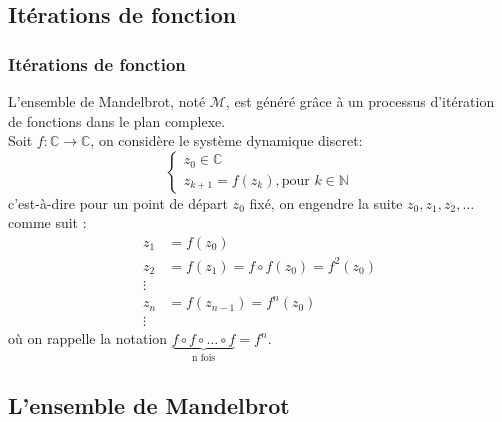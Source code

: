 \documentclass[aspectratio=1610]{beamer}
\begin{document}
\subsection{Itérations de fonction}

\begin{frame}
\frametitle{Itérations de fonction}
   L'ensemble de Mandelbrot, noté $\mathcal{M}$, est généré grâce à un processus d'itération de fonctions dans le plan complexe. \\
       Soit $ f: \mathbb{C} \to \mathbb{C} $, on considère le système dynamique discret:
       \[
       \begin{cases}
           z_0\in \mathbb{C}\\
           z_{k+1}=f(z_{k}), \text{pour }k \in \mathbb{N}
       \end{cases}
       \] 
   c'est-à-dire pour un point de départ $z_0$ fixé, on engendre la suite $z_0, z_1, z_2, \ldots$ comme suit :\\
    \begin{align*}
    z_1 &=f(z_0)\\
     z_2 &=f(z_1)=f\circ f(z_0)=f^{2}(z_0)\\
     \vdots &\\ 
     z_{n} &=f(z_{n-1})=f^{n}(z_0)\\
     \vdots &
    \end{align*}
 où on rappelle la notation $\underbrace{f\circ f\circ \ldots \circ f}_{\text{n fois}}=f^{n}$.
\end{frame}

\subsection{L'ensemble de Mandelbrot}
\end{document}
